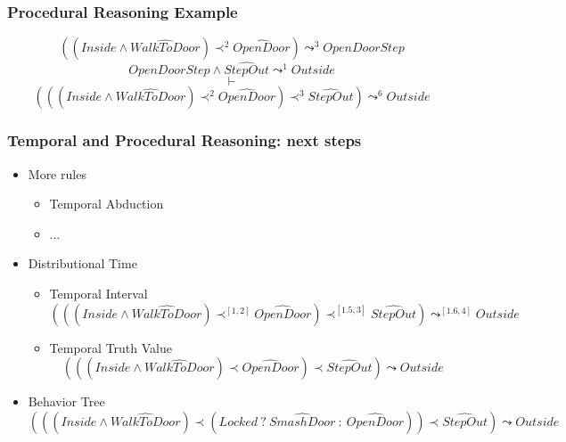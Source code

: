 \documentclass[aspectratio=169]{beamer}
\begin{document}
\begin{frame}
  \frametitle{Procedural Reasoning Example}
  $$\left( \left( Inside \wedge \widehat{WalkToDoor}\right)
  \prec^{2} \widehat{OpenDoor}\right) \leadsto^{3} OpenDoorStep$$
  $$OpenDoorStep \wedge \widehat{StepOut} \leadsto^{1} Outside$$
  $$\vdash$$
  $$\left( \left( \left( Inside \wedge \widehat{WalkToDoor}\right)
  \prec^{2} \widehat{OpenDoor}\right) \prec^{3} \widehat{StepOut}\right) \leadsto^{6} Outside$$
\end{frame}

\begin{frame}
  \frametitle{Temporal and Procedural Reasoning: next steps}
  \begin{itemize}
  \item<+-> More rules
    \begin{itemize}
    \item Temporal Abduction
    \item $\dots$
    \end{itemize}
  \item<+-> Distributional Time
    \begin{itemize}
    \item Temporal Interval
      $$(((Inside \wedge \widehat{WalkToDoor}) \prec^{[1,2]}
    \widehat{OpenDoor}) \prec^{[1.5,3]} \widehat{StepOut}) \leadsto^{[1.6,4]}
    Outside$$
  \item Temporal Truth Value
      $$(((Inside \wedge \widehat{WalkToDoor}) \prec
    \widehat{OpenDoor}) \prec \widehat{StepOut}) \leadsto Outside$$
    \end{itemize}
  \item<+-> Behavior Tree
    {\small
      $$(((Inside \wedge \widehat{WalkToDoor}) \prec
    (Locked\ ?\ \widehat{SmashDoor}\ :\ \widehat{OpenDoor})) \prec \widehat{StepOut}) \leadsto Outside$$}
  \end{itemize}
\end{frame}
\end{document}
